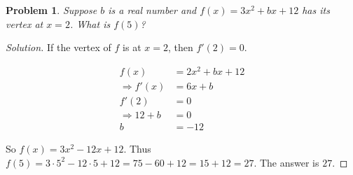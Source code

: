\documentclass[12pt,oneside]{book}
\theoremstyle{mystyle}
\newtheorem{problem}{Problem}[section]
\begin{document}
\begin{problem}
Suppose $b$ is a real number and $f(x) = 3x^2+bx+12$ has its vertex at $x=2$. What is $f(5)$?
\end{problem}
\begin{proof}[Solution]
If the vertex of $f$ is at $x=2$, then $f'(2) = 0$.

\begin{align}
    \nonumber f(x) &= 2x^2 + bx + 12 \\
    \nonumber \Rightarrow f'(x) &= 6x+b \\
    \nonumber f'(2) &= 0 \\
    \nonumber \Rightarrow 12 + b &= 0 \\
    \nonumber b &= -12
\end{align}

So $f(x) = 3x^2 -12 x + 12$. Thus $f(5) = 3\cdot 5^2 - 12\cdot 5 + 12 = 75 - 60 + 12 = 15 + 12 = 27$. The answer is $27$.
\end{proof}
\end{document}
